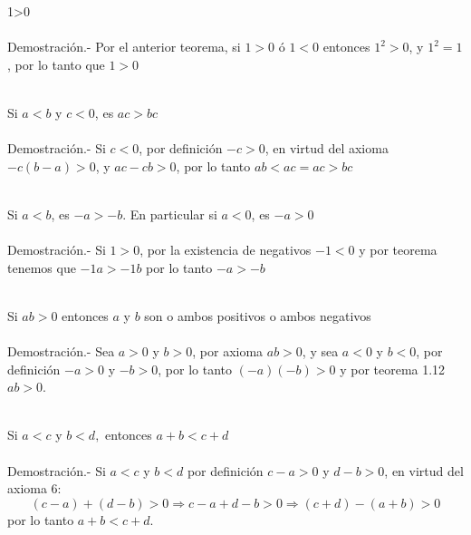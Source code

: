 \begin{enumerate}[\bfseries  1.]
\begin{teo}
1>0\\\\
Demostración.- \;
Por el anterior teorema, si $1>0$ ó $1<0$ entonces $1^2>0$, y $1^2=1$, por lo tanto que $1>0$\\\\
\end{teo}

\begin{teo}
Si $a<b$ y $c<0$, es $ac>bc$\\\\
Demostración.- \;
Si $c<0$, por definición $-c>0$, en virtud del axioma  $-c(b-a)>0$, y $ac-cb>0$, por lo tanto $ab<ac=ac>bc$\\\\
\end{teo}

\begin{teo}
Si $a<b$, es $-a>-b$. En particular si $a<0$, es $-a>0$\\\\
Demostración.- \;
Si $1>0$, por la existencia de negativos $-1<0$ y por teorema  tenemos que $-1a>-1b$ por lo tanto $-a>-b$ \\\\
\end{teo}

\begin{teo}
Si $ab>0$ entonces $a$ y $b$ son o ambos positivos o ambos negativos\\\\
Demostración.- \;
Sea $a>0$ y $b>0$, por axioma  \;  $ab>0$, y sea $a<0$ y $b<0$, por definición $-a>0$ y $-b>0$, por lo tanto $(-a)(-b)>0$ y por teorema 1.12 \; $ab>0$.\\\\
\end{teo}

\begin{teo}
Si $a<c$ y $b<d,$ entonces $a+b<c+d$\\\\
Demostración.- \;
Si $a<c$ \; y \; $b<d$ por definición $c-a>0$ \; y \; $d-b>0$, en virtud del axioma 6:
$$(c-a)+(d-b)>0 \Rightarrow c-a+d-b>0 \Rightarrow (c+d)-(a+b)>0$$ 
por lo tanto $a+b<c+d$.\\\\ 
\end{teo}


\end{enumerate}
